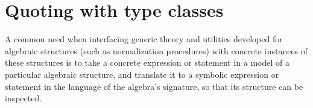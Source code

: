 \documentclass[a4paper,10pt,runningheads]{llncs}
\begin{document}
% 
% 
% 
% 



\section{Quoting with type classes}\label{quote}

A common need when interfacing generic theory and utilities developed for algebraic structures (such as normalization procedures) with concrete instances of these structures is to take a concrete expression or statement in a model of a particular algebraic structure, and translate it to a symbolic expression or statement in the language of the algebra's signature, so that its structure can be inspected.
\end{document}
